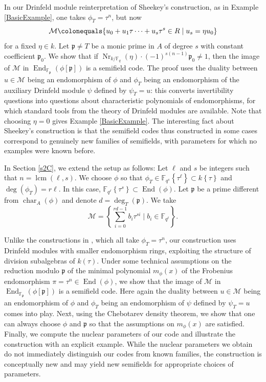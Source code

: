 \documentclass[12pt]{amsart}
\theoremstyle{definition}
\theoremstyle{remark}
\numberwithin{equation}{section}
\numberwithin{thm}{section}
\DeclareMathOperator{\End}{End}
\DeclareMathOperator{\chr}{char}
\DeclareMathOperator{\Nr}{Nr}
\DeclareMathOperator{\lcm}{lcm}
\newcommand{\fp}{\mathfrak{p}}
\newcommand{\cM}{\mathcal{M}}
\newcommand{\F}{\mathbb{F}}
\newcommand{\twist}[1]{#1\!\left\{\tau\right\}}
\newcommand{\twistt}[2]{#1\!\left\{#2\right\}}
\begin{document}
In our Drinfeld module reinterpretation of Sheekey's construction, as in Example \ref{BasicExample}, one takes $\phi_T=\tau^n$, but now 
$$
\cM \colonequals \{u_0+u_1\tau\cdots+u_s\tau^s\in R\mid  u_s=\eta u_0\}
$$
for a fixed $\eta\in k$. Let $\fp\neq T$ be a monic prime in $A$ of degree $s$ with constant coefficient $\fp_0$. We show that if 
$\Nr_{k/\F_q}(\eta)\cdot (-1)^{s(n-1)}\fp_0\neq 1$, then the image of $\cM$ in $\End_{\F_\fp}(\phi[\fp])$ is a semifield code. The proof 
uses the duality between $u \in \cM$ 
being an endomorphism of $\phi$ and $\phi_T$ being an endomorphism of the auxiliary 
Drinfeld module $\psi$ defined by $\psi_T=u$: this converts invertibility questions into questions about 
characteristic polynomials of endomorphisms, for which standard tools from the theory of Drinfeld 
modules are available. Note that choosing $\eta=0$ gives Example \ref{BasicExample}. The interesting fact about Sheekey's construction 
is that the semifield codes thus constructed in some cases correspond to genuinely new families of semifields, with 
parameters for which no examples were known before. 


In Section \ref{s2C}, we extend the setup as follows: 
Let $\ell$ and $s$ be integers such that $n=\lcm(\ell, s)$. We choose $\phi$ so that $\phi_T\in \twistt{\F_{q^s}}{\tau^\ell}\subset \twist{k}$ 
and $\deg(\phi_T)=r\ell$. In this case, $\twistt{\F_{q^\ell}}{\tau^s}\subset \End(\phi)$. Let $\fp$ be a prime different from 
$\chr_A(\phi)$ and denote $d=\deg_T(\fp)$. We take 
$$
\cM=\left\{\sum_{i=0}^{rd-1} b_i\tau^{s i}\mid b_i\in \F_{q^\ell}\right\}. 
$$

Unlike the constructions in \cite{Sheekey, TZ, LSS, GTLNS}, which all take $\phi_T = \tau^n$, 
our construction uses Drinfeld modules with smaller endomorphism rings, exploiting 
the structure of division subalgebras of $k(\tau)$.
Under some technical assumptions on the reduction modulo $\fp$ of the minimal polynomial $m_\phi(x)$ of the Frobenius endomorphism $\pi=\tau^n\in \End(\phi)$, 
we show that the image of $\cM$ in $\End_{\F_\fp}(\phi[\fp])$ is a semifield code. Here again the duality between $u\in \cM$ being an 
endomorphism of $\phi$ and $\phi_T$ being an endomorphism of $\psi$ defined by $\psi_T=u$ comes into play. Next, 
using the Chebotarev density theorem, we show that one can always choose $\phi$ and $\fp$ so that the assumptions on $m_\phi(x)$ 
are satisfied. Finally, we compute the nuclear parameters of our code and illustrate the construction with an 
explicit example. While the nuclear parameters we obtain do not immediately 
distinguish our codes from known families, the construction is conceptually new  
and may yield new semifields for appropriate choices of parameters.
\end{document}
